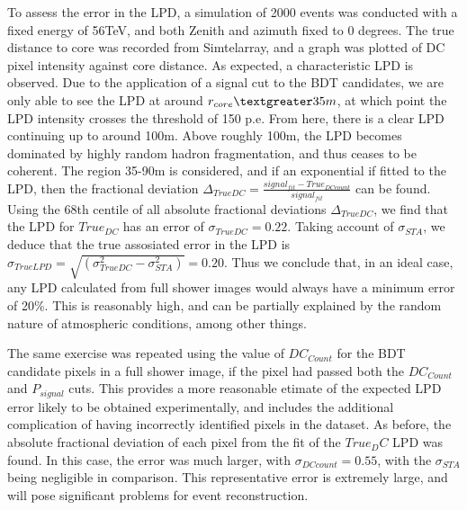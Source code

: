 \documentclass{article}
\begin{document}
To assess the error in the LPD, a simulation of 2000 events was conducted with a fixed energy of 56TeV, and both Zenith and azimuth fixed to 0 degrees. The true distance to core was recorded from Sim\textunderscore telarray, and a graph was plotted of DC pixel intensity against core distance. As expected, a characteristic LPD is observed. Due to the application of a signal cut to the BDT candidates, we are only able to see the LPD at around $r_{core} \textgreater 35m$, at which point the LPD intensity crosses the threshold of 150 p.e. From here, there is a clear LPD continuing up to around 100m. Above roughly 100m, the LPD becomes dominated by highly random hadron fragmentation, and thus ceases to be coherent. The region 35-90m is considered, and if an exponential if fitted to the LPD, then the fractional deviation $\Delta_{TrueDC} = \frac{signal_{fit} - True_{DC count}}{signal_{fit}}$ can be found. Using the 68th centile of all absolute fractional deviations $\Delta_{TrueDC}$, we find that the LPD for $True_{DC}$ has an error of $\sigma_{TrueDC}=0.22$. Taking account of $\sigma_{STA}$, we deduce that the true assosiated error in the LPD is $\sigma_{TrueLPD} = \sqrt{(\sigma_{TrueDC}^{2} - \sigma_{STA}^{2})} = 0.20$. Thus we conclude that, in an ideal case, any LPD calculated from full shower images would always have a minimum error of 20\%. This is reasonably high, and can be partially explained by the random nature of atmospheric conditions, among other things.

The same exercise was repeated using the value of $DC_{Count}$ for the BDT candidate pixels in a full shower image, if the pixel had passed both the $DC_{Count}$ and $P_{signal}$ cuts. This provides a more reasonable etimate of the expected LPD error likely to be obtained experimentally, and includes the additional complication of having incorrectly identified pixels in the dataset. As before, the absolute fractional deviation of each pixel from the fit of the $True_DC$ LPD was found. In this case, the error was much larger, with $\sigma_{DCcount}=0.55$, with the $\sigma_{STA}$ being negligible in comparison. This representative error is extremely large, and will pose significant problems for event reconstruction.
\end{document}
